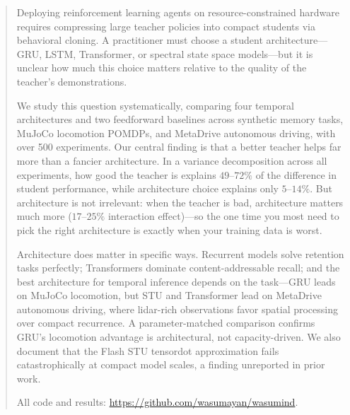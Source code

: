 \begin{abstract}

Deploying reinforcement learning agents on resource-constrained hardware requires compressing large teacher policies into compact students via behavioral cloning.
A practitioner must choose a student architecture---GRU, LSTM, Transformer, or spectral state space models---but it is unclear how much this choice matters relative to the quality of the teacher's demonstrations.

We study this question systematically, comparing four temporal architectures and two feedforward baselines across synthetic memory tasks, MuJoCo locomotion POMDPs, and MetaDrive autonomous driving, with over 500 experiments.
Our central finding is that a better teacher helps far more than a fancier architecture.
In a variance decomposition across all experiments, how good the teacher is explains $49$--$72\%$ of the difference in student performance, while architecture choice explains only $5$--$14\%$.
But architecture is not irrelevant: when the teacher is bad, architecture matters much more ($17$--$25\%$ interaction effect)---so the one time you most need to pick the right architecture is exactly when your training data is worst.

Architecture does matter in specific ways.
Recurrent models solve retention tasks perfectly; Transformers dominate content-addressable recall; and the best architecture for temporal inference depends on the task---GRU leads on MuJoCo locomotion, but STU and Transformer lead on MetaDrive autonomous driving, where lidar-rich observations favor spatial processing over compact recurrence.
A parameter-matched comparison confirms GRU's locomotion advantage is architectural, not capacity-driven.
We also document that the Flash STU tensordot approximation fails catastrophically at compact model scales, a finding unreported in prior work.

All code and results: \url{https://github.com/wasumayan/wasumind}.

\end{abstract}
